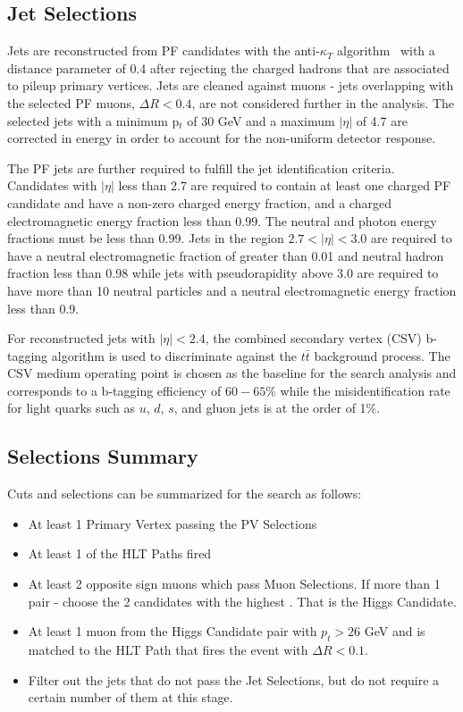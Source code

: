 \subsection{Jet Selections}
Jets are reconstructed from PF candidates with the anti-$\kappa_{T}$ algorithm~\cite{Cacciari:2008gp} with a distance parameter of 0.4 after rejecting the charged hadrons that are associated to pileup primary vertices. Jets are cleaned against muons - jets overlapping with the selected PF muons, $\Delta R < 0.4$, are not considered further in the analysis. The selected jets with a minimum p$_t$ of 30 GeV and a maximum $|\eta|$ of 4.7 are corrected in energy in order to account for the non-uniform detector response.

The PF jets are further required to fulfill the jet identification criteria.
Candidates with $|\eta|$ less than 2.7 are required to contain at
least one charged PF candidate and have a non-zero charged energy fraction,
and a charged electromagnetic energy fraction less than 0.99. The
neutral and photon energy fractions must be less than 0.99. Jets in
the region $2.7<|\eta|<3.0$ are required to have a neutral electromagnetic
fraction of greater than 0.01 and neutral hadron fraction less than
0.98 while jets with pseudorapidity above 3.0 are required to have more
than 10 neutral particles and a neutral electromagnetic energy fraction
less than 0.9.

For reconstructed jets with $|\eta| < 2.4$, the combined secondary vertex (CSV) b-tagging algorithm \cite{Chatrchyan:2012jua} is used to discriminate against the $t\bar{t}$ background process. The CSV medium operating point is chosen as the baseline for the search analysis and corresponds to a b-tagging efficiency of $60-65\%$ while the misidentification rate for light quarks such as $u$, $d$, $s$, and gluon jets is at the order of 1\%.

\subsection{Selections Summary}
Cuts and selections can be summarized for the search as follows:
\begin{itemize}
  \item At least 1 Primary Vertex passing the PV Selections
  \item At least 1 of the HLT Paths fired
  \item At least 2 opposite sign muons which pass Muon Selections. If more than 1 pair - choose the 2 candidates with the highest \pt. That is the Higgs Candidate.
  \item At least 1 muon from the Higgs Candidate pair with $p_t > 26$ GeV and is matched to the HLT Path that fires the event with $\Delta R < 0.1$.
  \item Filter out the jets that do not pass the Jet Selections, but do not require a certain number of them at this stage.
\end{itemize}

